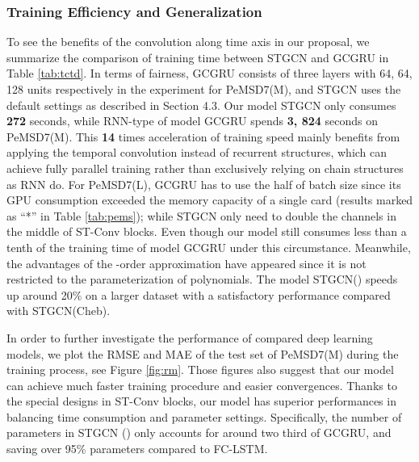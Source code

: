 \documentclass{article}
\begin{document}
\subsubsection{Training Efficiency and Generalization} 
To see the benefits of the convolution along time axis in our proposal, we summarize the comparison of training time between STGCN and GCGRU in Table \ref{tab:tctd}. In terms of fairness, GCGRU consists of three layers with 64, 64, 128 units respectively in the experiment for PeMSD7(M), and STGCN uses the default settings as described in Section 4.3. Our model STGCN only consumes \textbf{272} seconds, while RNN-type of model GCGRU spends \textbf{3, 824} seconds on PeMSD7(M). This \textbf{14} times acceleration of training speed mainly benefits from applying the temporal convolution instead of recurrent structures, which can achieve fully parallel training rather than exclusively relying on chain structures as RNN do. For PeMSD7(L), GCGRU has to use the half of batch size since its GPU consumption exceeded the memory capacity of a single card (results marked as ``*'' in Table \ref{tab:pems}); while STGCN only need to double the channels in the middle of ST-Conv blocks. Even though our model still consumes less than a tenth of the training time of model GCGRU under this circumstance. Meanwhile, the advantages of the -order approximation have appeared since it is not restricted to the parameterization of polynomials. The model STGCN() speeds up around 20\% on a larger dataset with a satisfactory performance compared with STGCN(Cheb).

In order to further investigate the performance of compared deep learning models, we plot the RMSE and MAE of the test set of PeMSD7(M) during the training process, see Figure \ref{fig:rm}. Those figures also suggest that our model can achieve much faster training procedure and easier convergences. Thanks to the special designs in ST-Conv blocks, our model has superior performances in balancing time consumption and parameter settings. Specifically, the number of parameters in STGCN () only accounts for around two third of GCGRU, and saving over 95\% parameters compared to FC-LSTM.

\begin{table}
\centering
{}
\caption{Time consumptions of training on the dataset PeMSD7.}
\label{tab:tctd}
\end{table}
\end{document}

